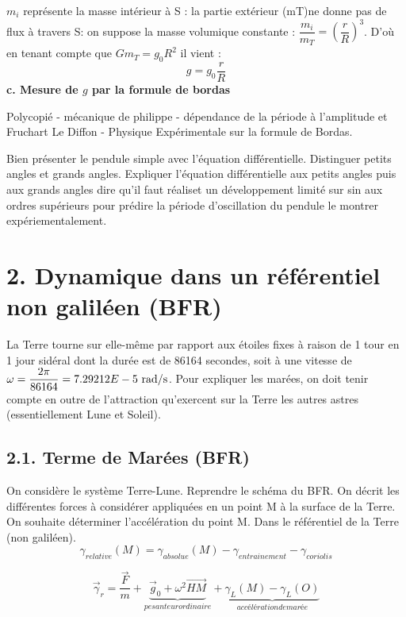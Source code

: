 \documentclass[french, a4paper, 10pt, twocolumn, landscape]{article}
\begin{document}
$m_i$ représente la masse intérieur à S : la partie extérieur (mT)ne donne pas de flux à travers S: on suppose la masse volumique constante : $\dfrac{m_i}{m_T} = \left(\dfrac{r}{R}\right)^3$. D'où en tenant compte que $Gm_T = g_0R^2$ il vient : $$g=g_0\dfrac{r}{R}$$
\textbf{c. Mesure de $g$ par la formule de bordas}

Polycopié - mécanique de philippe - dépendance de la période à l'amplitude et Fruchart Le Diffon - Physique Expérimentale sur la formule de Bordas.\medskip
 

Bien présenter le pendule simple avec l'équation différentielle. Distinguer petits angles et grands angles. Expliquer l'équation différentielle aux petits angles puis aux grands angles dire qu'il faut réaliset un développement limité sur sin aux ordres supérieurs pour prédire la période d'oscillation du pendule le montrer expériementalement.


\section*{2. Dynamique dans un référentiel non galiléen (BFR)}

La Terre tourne sur elle-même par rapport aux étoiles fixes à raison de 1 tour en 1 jour sidéral dont la durée est de 86164 secondes, soit à une vitesse de $\omega =\dfrac{2\pi}{86164}=7.29212E-5~\rm rad/s$. Pour expliquer les marées, on doit tenir compte en outre de l'attraction qu'exercent sur la Terre les autres astres (essentiellement Lune et Soleil).

\subsection*{2.1. Terme de Marées (BFR)}
On considère le système Terre-Lune. Reprendre le schéma du BFR. On décrit les différentes forces à considérer appliquées en un point M à la surface de la Terre. On souhaite déterminer l'accélération du point M. Dans le référentiel de la Terre (non galiléen). 
\begin{equation}
  \gamma_{relative}(M) = \gamma_{absolue}(M) - \gamma_{entrainement}-\gamma_{coriolis}
\end{equation}

\begin{equation}
  \vec{\gamma}_r = \dfrac{\vec{F}}{m} + \underbrace{\vec{g}_0+\omega^2\vec{HM}}_{pesanteur ordinaire}+\underbrace{\gamma_L(M)-\gamma_L(O)}_{accélération de marée}
\end{equation}
\end{document}
